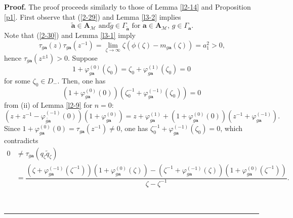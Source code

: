 \documentclass[a4paper]{article}%
\newenvironment{proof}[1][Proof]{\noindent\textbf{#1.} }{\ \rule{0.5em}{0.5em}}
\begin{document}
\begin{proof}
The proof proceeds similarly to those of Lemma \ref{l2-14} and Proposition
\ref{p1}. First observe that (\ref{2-29}) and Lemma \ref{l3-2} implies%
\begin{equation}
\ \widetilde{\boldsymbol{a}}\in\boldsymbol{A}_{\mathcal{M}}\text{ and
}\widetilde{g}\in\Gamma_{\widetilde{\boldsymbol{a}}}\text{ for }%
\boldsymbol{a}\in\boldsymbol{A}_{\mathcal{M}}\text{, }g\in\Gamma
_{\boldsymbol{a}}\text{.} \label{3-4}%
\end{equation}
Note that (\ref{2-30}) and Lemma \ref{l3-1} imply%
\[
\tau_{g\boldsymbol{a}}\left(  z\right)  \tau_{g\boldsymbol{a}}\left(
z^{-1}\right)  =\lim_{\zeta\rightarrow\infty}\zeta\left(  \phi\left(
\zeta\right)  -m_{g\boldsymbol{a}}(\zeta)\right)  =a_{1}^{2}>0\text{,}%
\]
hence $\tau_{g\boldsymbol{a}}\left(  z^{\pm1}\right)  >0$. Suppose%
\[
1+\varphi_{g\boldsymbol{a}}^{\left(  0\right)  }\left(  \zeta_{0}\right)
=\zeta_{0}+\varphi_{g\boldsymbol{a}}^{\left(  1\right)  }\left(  \zeta
_{0}\right)  =0
\]
for some $\zeta_{0}\in D_{-}$. Then, one has
\[
\left(  1+\varphi_{g\boldsymbol{a}}^{\left(  0\right)  }\left(  0\right)
\right)  \left(  \zeta_{0}^{-1}+\varphi_{g\boldsymbol{a}}^{\left(  -1\right)
}\left(  \zeta_{0}\right)  \right)  =0
\]
from (ii) of Lemma \ref{l2-9} for $n=0$:
\[
\left(  z+z^{-1}-\varphi_{\widetilde{g\boldsymbol{a}}}^{\left(  -1\right)
}\left(  0\right)  \right)  \left(  1+\varphi_{g\boldsymbol{a}}^{\left(
0\right)  }\right)  =z+\varphi_{g\boldsymbol{a}}^{\left(  1\right)  }+\left(
1+\varphi_{g\boldsymbol{a}}^{\left(  0\right)  }\left(  0\right)  \right)
\left(  z^{-1}+\varphi_{g\boldsymbol{a}}^{\left(  -1\right)  }\right)
\text{.}%
\]
Since $1+\varphi_{g\boldsymbol{a}}^{\left(  0\right)  }\left(  0\right)
=\tau_{g\boldsymbol{a}}\left(  z^{-1}\right)  \neq0$, one has $\zeta_{0}%
^{-1}+\varphi_{g\boldsymbol{a}}^{\left(  -1\right)  }\left(  \zeta_{0}\right)
=0$, which contradicts
\begin{align*}
0  &  \neq\tau_{g\boldsymbol{a}}\left(  q_{\zeta}\widetilde{q}_{\zeta}\right)
\\
&  =\dfrac{\left(  \zeta+\varphi_{g\boldsymbol{a}}^{\left(  -1\right)
}\left(  \zeta^{-1}\right)  \right)  \left(  1+\varphi_{g\boldsymbol{a}%
}^{\left(  0\right)  }\left(  \zeta\right)  \right)  -\left(  \zeta
^{-1}+\varphi_{g\boldsymbol{a}}^{\left(  -1\right)  }\left(  \zeta\right)
\right)  \left(  1+\varphi_{g\boldsymbol{a}}^{\left(  0\right)  }\left(
\zeta^{-1}\right)  \right)  }{\zeta-\zeta^{-1}}\text{.}%
\end{align*}

\end{proof}
\end{document}
